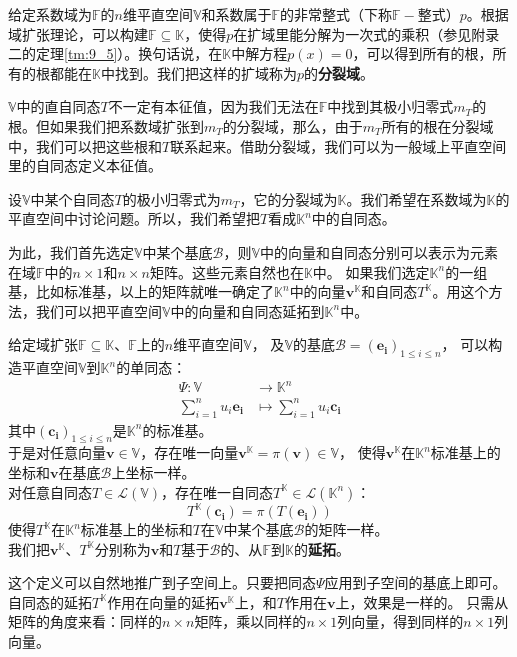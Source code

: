 \documentclass[12pt,UTF8,fontset=none]{ctexbook}
\begin{document}
给定系数域为$\mathbb{F}$的$n$维平直空间$\mathbb{V}$和系数属于$\mathbb{F}$的非常整式（下称$\mathbb{F}-$整式）$p$。根据域扩张理论，可以构建$\mathbb{F}\subseteq \mathbb{K}$，使得$p$在扩域里能分解为一次式的乘积（参见附录二的定理\ref{tm:9_5}）。换句话说，在$\mathbb{K}$中解方程$p(x)=0$，可以得到所有的根，所有的根都能在$\mathbb{K}$中找到。我们把这样的扩域称为$p$的\textbf{分裂域}。

$\mathbb{V}$中的直自同态$T$不一定有本征值，因为我们无法在$\mathbb{F}$中找到其极小归零式$m_T$的根。但如果我们把系数域扩张到$m_T$的分裂域，那么，由于$m_T$所有的根在分裂域中，我们可以把这些根和$T$联系起来。借助分裂域，我们可以为一般域上平直空间里的自同态定义本征值。

设$\mathbb{V}$中某个自同态$T$的极小归零式为$m_T$，它的分裂域为$\mathbb{K}$。我们希望在系数域为$\mathbb{K}$的平直空间中讨论问题。所以，我们希望把$T$看成$\mathbb{K}^n$中的自同态。

为此，我们首先选定$\mathbb{V}$中某个基底$\mathcal{B}$，则$\mathbb{V}$中的向量和自同态分别可以表示为元素在域$\mathbb{F}$中的$n\times 1$和$n\times n$矩阵。这些元素自然也在$\mathbb{K}$中。
如果我们选定$\mathbb{K}^n$的一组基，比如标准基，以上的矩阵就唯一确定了$\mathbb{K}^n$中的向量$\mathbf{v}^\mathbb{K}$和自同态$T^{\mathbb{K}}$。用这个方法，我们可以把平直空间$\mathbb{V}$中的向量和自同态延拓到$\mathbb{K}^n$中。

\begin{df}\label{df:9_3}
    给定域扩张$\mathbb{F}\subseteq\mathbb{K}$、$\mathbb{F}$上的$n$维平直空间$\mathbb{V}$，
    及$\mathbb{V}$的基底$\mathcal{B} = (\mathbf{e_i})_{1\leqslant i \leqslant n}$，
    可以构造平直空间$\mathbb{V}$到$\mathbb{K}^n$的单同态：
    \begin{align*}
        \Psi : \mathbb{V} &\rightarrow \mathbb{K}^n  \\
        \sum_{i=1}^n u_i\mathbf{e_i} &\mapsto  \sum_{i=1}^n u_i\mathbf{c_i} 
    \end{align*}
    其中$(\mathbf{c_i})_{1\leqslant i \leqslant n}$是$\mathbb{K}^n$的标准基。\\
    于是对任意向量$\mathbf{v} \in \mathbb{V}$，存在唯一向量$\mathbf{v}^\mathbb{K} = \pi(\mathbf{v})\in \mathbb{V}$，
    使得$\mathbf{v}^\mathbb{K}$在$\mathbb{K}^n$标准基上的坐标和$\mathbf{v}$在基底$\mathcal{B}$上坐标一样。\\
    对任意自同态$T \in \mathcal{L}(\mathbb{V})$，存在唯一自同态$T^{\mathbb{K}} \in \mathcal{L}(\mathbb{K}^n)$：
    $$ T^{\mathbb{K}}(\mathbf{c_i}) = \pi\left(T(\mathbf{e_i})\right) $$
    使得$T^{\mathbb{K}}$在$\mathbb{K}^n$标准基上的坐标和$T$在$\mathbb{V}$中某个基底$\mathcal{B}$的矩阵一样。\\
    我们把$\mathbf{v}^\mathbb{K}$、$T^{\mathbb{K}}$分别称为$\mathbf{v}$和$T$基于$\mathcal{B}$的、从$\mathbb{F}$到$\mathbb{K}$的\textbf{延拓}。
\end{df}
这个定义可以自然地推广到子空间上。只要把同态$\Psi$应用到子空间的基底上即可。
自同态的延拓$T^{\mathbb{K}}$作用在向量的延拓$\mathbf{v}^{\mathbb{K}}$上，和$T$作用在$\mathbf{v}$上，效果是一样的。
只需从矩阵的角度来看：同样的$n\times n$矩阵，乘以同样的$n\times 1$列向量，得到同样的$n\times 1$列向量。
\end{document}

